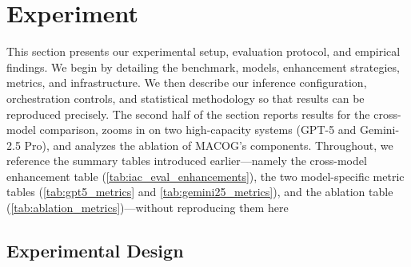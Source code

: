 \documentclass[manuscript,screen,nonacm]{acmart}
\begin{document}








\section{Experiment}
\label{sec:experiment}

This section presents our experimental setup, evaluation protocol, and empirical findings. We begin by detailing the benchmark, models, enhancement strategies, metrics, and infrastructure. We then describe our inference configuration, orchestration controls, and statistical methodology so that results can be reproduced precisely. The second half of the section reports results for the cross-model comparison, zooms in on two high-capacity systems (GPT-5 and Gemini-2.5 Pro), and analyzes the ablation of MACOG’s components. Throughout, we reference the summary tables introduced earlier—namely the cross-model enhancement table (\autoref{tab:iac_eval_enhancements}), the two model-specific metric tables (\autoref{tab:gpt5_metrics} and \autoref{tab:gemini25_metrics}), and the ablation table (\autoref{tab:ablation_metrics})—without reproducing them here

\subsection{Experimental Design}
\label{sec:exp-design}
\end{document}
